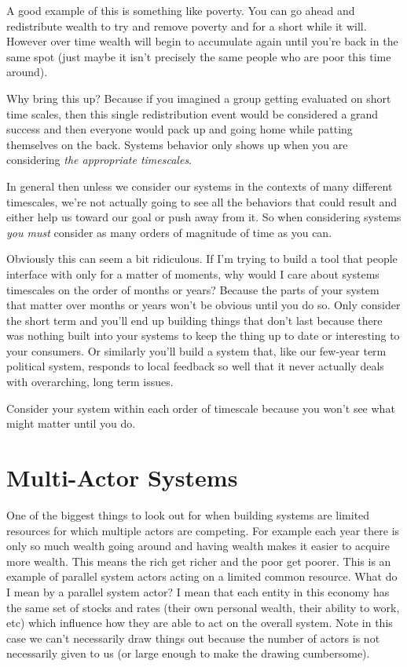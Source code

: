 \documentclass[11pt,a5paper]{book}
\begin{document}
A good example of this is something like poverty. You can go ahead and redistribute wealth to try and remove poverty and for a short while it will. However over time wealth will begin to accumulate again until you're back in the same spot (just maybe it isn't precisely the same people who are poor this time around). 
\newline

Why bring this up? Because if you imagined a group getting evaluated on short time scales, then this single redistribution event would be considered a grand success and then everyone would pack up and going home while patting themselves on the back. Systems behavior only shows up when you are considering \textit{the appropriate timescales}. 
\newline

In general then unless we consider our systems in the contexts of many different timescales, we're not actually going to see all the behaviors that could result and either help us toward our goal or push away from it. So when considering systems \textit{you must} consider as many orders of magnitude of time as you can.
\newline

Obviously this can seem a bit ridiculous. If I'm trying to build a tool that people interface with only for a matter of moments, why would I care about systems timescales on the order of months or years? Because the parts of your system that matter over months or years won't be obvious until you do so. Only consider the short term and you'll end up building things that don't last because there was nothing built into your systems to keep the thing up to date or interesting to your consumers. Or similarly you'll build a system that, like our few-year term political system, responds to local feedback so well that it never actually deals with overarching, long term issues. 
\newline

Consider your system within each order of timescale because you won't see what might matter until you do.

\section{Multi-Actor Systems}
One of the biggest things to look out for when building systems are limited resources for which multiple actors are competing. For example each year there is only so much wealth going around and having wealth makes it easier to acquire more wealth. This means the rich get richer and the poor get poorer. This is an example of parallel system actors acting on a limited common resource. What do I mean by a parallel system actor? I mean that each entity in this economy has the same set of stocks and rates (their own personal wealth, their ability to work, etc) which influence how they are able to act on the overall system. Note in this case we can't necessarily draw things out because the number of actors is not necessarily given to us (or large enough to make the drawing cumbersome).
\newline
\end{document}
